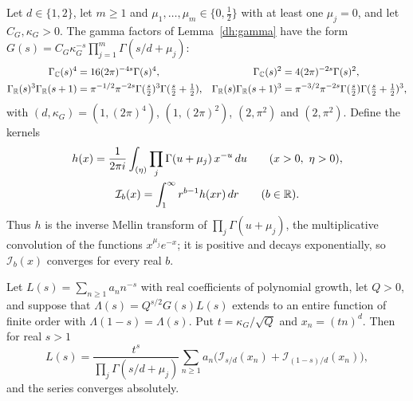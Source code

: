 Let $d\in\{1,2\}$, let $m\ge1$ and $\mu_1,\dots,\mu_m\in\{0,\frac12\}$ with at
least one $\mu_j=0$, and let $C_G,\kappa_G>0$. The gamma factors of
Lemma~\ref{dh:gamma} have the form
$G(s)=C_G\kappa_G^{-s}\prod_{j=1}^m\Gamma(s/d+\mu_j)$:
\[
 \begin{aligned}
 \Gamma_\mathbb C(s)^4&=16(2\pi)^{-4s}\Gamma(s)^4,&
 \Gamma_\mathbb C(s)^2&=4(2\pi)^{-2s}\Gamma(s)^2,\\
 \Gamma_\mathbb R(s)^3\Gamma_\mathbb R(s+1)&=\pi^{-1/2}\pi^{-2s}\Gamma(\tfrac s2)^3\Gamma(\tfrac s2+\tfrac12),&
 \Gamma_\mathbb R(s)\Gamma_\mathbb R(s+1)^3&=\pi^{-3/2}\pi^{-2s}\Gamma(\tfrac s2)\Gamma(\tfrac s2+\tfrac12)^3,
 \end{aligned}
\]
with $(d,\kappa_G)=(1,(2\pi)^4)$, $(1,(2\pi)^2)$, $(2,\pi^2)$ and $(2,\pi^2)$.
Define the kernels
\begin{gather*}
 h(x)=\frac1{2\pi i}\int_{(\eta)}\prod_j\Gamma(u+\mu_j)\,x^{-u}\,du\qquad(x>0,\ \eta>0),\\
 \mathcal I_b(x)=\int_1^\infty r^{b-1}h(xr)\,dr\qquad(b\in\R).
\end{gather*}
Thus $h$ is the inverse Mellin transform of $\prod_j\Gamma(u+\mu_j)$, the
multiplicative convolution of the functions $x^{\mu_j}e^{-x}$; it is positive
and decays exponentially, so $\mathcal I_b(x)$ converges for every real $b$.

\begin{lemma}\label{lv:afe}
Let $L(s)=\sum_{n\ge1}a_nn^{-s}$ with real coefficients of polynomial growth,
let $Q>0$, and suppose that $\Lambda(s)=Q^{s/2}G(s)L(s)$ extends to an
entire function of finite order with $\Lambda(1-s)=\Lambda(s)$. Put
$t=\kappa_G/\sqrt Q$ and $x_n=(tn)^d$. Then for real $s>1$
\[
 L(s)=\frac{t^s}{\prod_j\Gamma(s/d+\mu_j)}\sum_{n\ge1}a_n
 \bigl(\mathcal I_{s/d}(x_n)+\mathcal I_{(1-s)/d}(x_n)\bigr),
\]
and the series converges absolutely.
\end{lemma}


